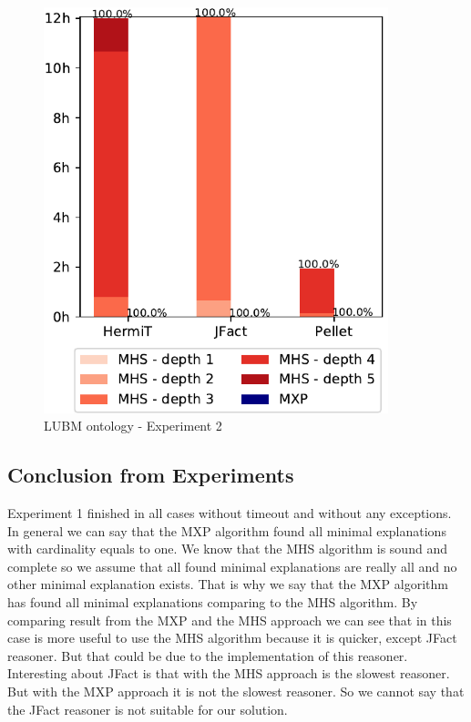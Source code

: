 \documentclass[12pt,a4paper]{article}
\begin{document}
\begin{figure}[H]
	\centering
	\includegraphics[width=10cm]{eval2LUBM} 
	\caption{LUBM ontology - Experiment 2}
	\label{fig:eval2LUBM}
\end{figure}

\subsection{Conclusion from Experiments}
Experiment 1 finished in all cases without timeout and without any exceptions. In general we can say that the MXP algorithm found all minimal explanations with cardinality equals to one. We know that the MHS algorithm is sound and complete so we assume that all found minimal explanations are really all and no other minimal explanation exists. That is why we say that the MXP algorithm has found all minimal explanations comparing to the MHS algorithm. By comparing result from the MXP and the MHS approach we can see that in this case is more useful to use the MHS algorithm because it is quicker, except JFact reasoner. But that could be due to the implementation of this reasoner. Interesting about JFact is that with the MHS approach is the slowest reasoner. But with the MXP approach it is not the slowest reasoner. So we cannot say that the JFact reasoner is not suitable for our solution.
\end{document}
